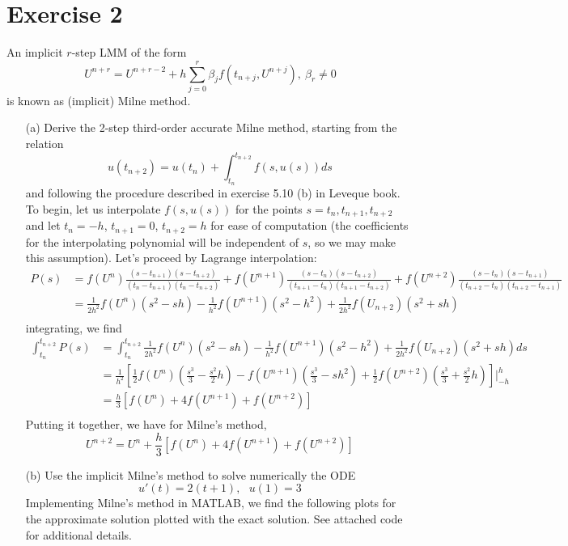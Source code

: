 \documentclass{article}
\begin{document}
\section*{Exercise 2}
An implicit $r$-step LMM of the form
\[U^{n+r} = U^{n+r-2} + h\sum_{j=0}^r\beta_jf(t_{n+j},U^{n+j}), \: \beta_r \neq 0\]
is known as (implicit) Milne method.
\begin{enumerate}
    \item[(a)] Derive the 2-step third-order accurate Milne method, starting from the relation
    \[u(t_{n+2}) = u(t_n) + \int_{t_n}^{t_{n+2}}f(s,u(s))ds\]
    and following the procedure described in exercise 5.10 (b) in Leveque book. 
    \newline\newline
    To begin, let us interpolate $f(s,u(s))$ for the points $s = t_n, t_{n+1}, t_{n+2}$ and let $t_n = -h$, $t_{n+1} = 0$, $t_{n+2} = h$ for ease of computation (the coefficients for the interpolating polynomial will be independent of $s$, so we may make this assumption). Let's proceed by Lagrange interpolation:
    \begin{align*}
        P(s) &= f(U^n)\frac{(s-t_{n+1})(s-t_{n+2})}{(t_n - t_{n+1})(t_n - t _{n+2})} + f(U^{n+1})\frac{(s-t_n)(s-t_{n+2})}{(t_{n+1} - t_{n})(t_{n+1} - t_{n+2})} + f(U^{n+2})\frac{(s-t_n)(s - t_{n+1})}{(t_{n+2} - t_n)(t_{n + 2} - t_{n+1})} \\
        &= \frac{1}{2h^2}f(U^n)(s^2-sh) - \frac{1}{h^2}f(U^{n+1})(s^2-h^2) + \frac{1}{2h^2}f(U_{n+2})(s^2 + sh) \\
    \end{align*}
    integrating, we find
    \begin{align*}
        \int_{t_n}^{t_{n+2}}P(s) &= \int_{t_n}^{t_{n+2}}\frac{1}{2h^2}f(U^n)(s^2-sh) - \frac{1}{h^2}f(U^{n+1})(s^2-h^2) + \frac{1}{2h^2}f(U_{n+2})(s^2 + sh) ds \\
        &= \frac{1}{h^2}\left[\frac{1}{2}f(U^n)\left(\frac{s^3}{3}- \frac{s^2}{2}h\right) - f(U^{n+1})\left(\frac{s^3}{3} - sh^2\right) + \frac{1}{2}f(U^{n+2})\left(\frac{s^3}{3} + \frac{s^2}{2}h\right)\right]\bigg|_{-h}^h \\
        &= \frac{h}{3}\left[f(U^n) + 4f(U^{n+1}) + f(U^{n+2})\right] \\
    \end{align*}
    Putting it together, we have for Milne's method,
    \[U^{n+2} = U^{n} + \frac{h}{3}\left[f(U^n) + 4f(U^{n+1}) + f(U^{n+2})\right]\]
    
    \item[(b)] Use the implicit Milne's method to solve numerically the ODE
    \[u'(t) = 2(t + 1), \:\:\: u(1) = 3\]
    Implementing Milne's method in MATLAB, we find the following plots for the approximate solution plotted with the exact solution. See attached code for additional details.
\end{enumerate}
\end{document}
